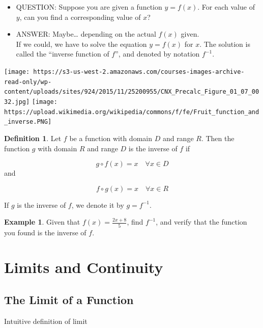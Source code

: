 \documentclass[
]{book}
\providecommand{\tightlist}{%
  \setlength{\itemsep}{0pt}\setlength{\parskip}{0pt}}
\theoremstyle{definition}
\newtheorem{definition}{Definition}[chapter]
\theoremstyle{definition}
\newtheorem{example}{Example}[chapter]
\theoremstyle{definition}
\theoremstyle{definition}
\theoremstyle{remark}
\begin{document}
\begin{itemize}
\tightlist
\item
  QUESTION: Suppose you are given a function \(y = f(x)\). For each value of \(y\), can you find a corresponding value of \(x\)?\\
\item
  ANSWER: Maybe\ldots{} depending on the actual \(f(x)\) given.\\
  If we could, we have to solve the equation \(y = f(x)\) for \(x\). The solution is called the ``inverse function of \(f\)'', and denoted by notation \(f^{-1}\).
\end{itemize}

\texttt{[image: https://s3-us-west-2.amazonaws.com/courses-images-archive-read-only/wp-content/uploads/sites/924/2015/11/25200955/CNX\_Precalc\_Figure\_01\_07\_0032.jpg]}
\texttt{[image: https://upload.wikimedia.org/wikipedia/commons/f/fe/Fruit\_function\_and\_inverse.PNG]}

\begin{definition}
\protect\hypertarget{def:unnamed-chunk-7}{}\label{def:unnamed-chunk-7}Let \(f\) be a function with domain \(D\) and range \(R\). Then the function \(g\) with domain \(R\) and range \(D\) is the inverse of \(f\) if

\[
g \circ f(x) = x \quad \forall x \in D
\]
and

\[
f \circ g(x) = x \quad \forall x \in R
\]

If \(g\) is the inverse of \(f\), we denote it by \(g = f^{-1}\).
\end{definition}

\begin{example}
\protect\hypertarget{exm:unnamed-chunk-8}{}\label{exm:unnamed-chunk-8}Given that \(f(x) = \frac{2x + 8}{5}\), find \(f^{-1}\), and verify that the function you found is the inverse of \(f\).
\end{example}

\chapter{Limits and Continuity}\label{limits-and-continuity}

\section{The Limit of a Function}\label{the-limit-of-a-function}

Intuitive definition of limit
\end{document}
